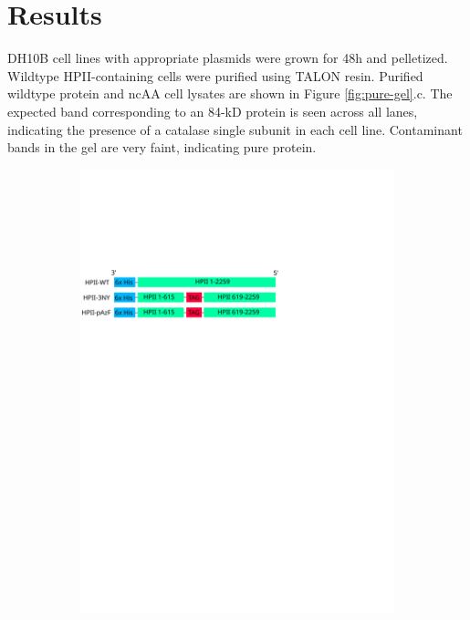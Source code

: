 \documentclass[journal=jacsat,manuscript=article]{achemso}
\begin{document}
\section{Results}
DH10B cell lines with appropriate plasmids were grown for 48h and pelletized. Wildtype HPII-containing cells were purified using TALON resin. Purified wildtype protein and ncAA cell lysates are shown in Figure \ref{fig:pure-gel}.c. The expected band corresponding to an 84-kD protein is seen across all lanes, indicating the presence of a catalase single subunit in each cell line. Contaminant bands in the gel are very faint, indicating pure protein.\\

\begin{figure}[h!]
  \centering
  \begin{subfigure}{0.49\textwidth}
    \begin{minipage}{0.1\textwidth}\caption{}\end{minipage}%
    \begin{minipage}{0.9\textwidth}\includegraphics[width=0.9\linewidth]{figures/gene-diagram}\end{minipage}

\end{subfigure}
\end{figure}
\end{document}
